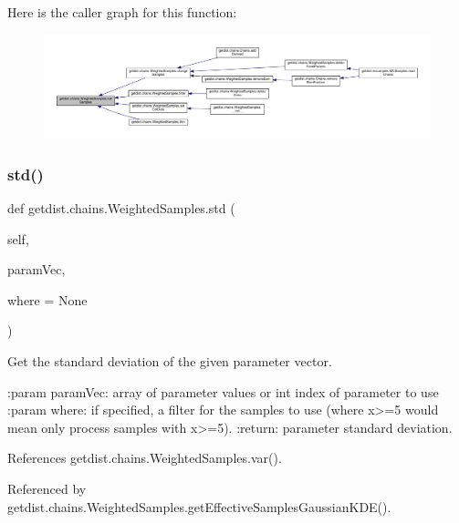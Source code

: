 Here is the caller graph for this function\+:
\nopagebreak
\begin{figure}[H]
\begin{center}
\leavevmode
\includegraphics[width=350pt]{classgetdist_1_1chains_1_1WeightedSamples_a94b1bddfee0767cad6fdca9c12a045d9_icgraph}
\end{center}
\end{figure}
\mbox{\label{classgetdist_1_1chains_1_1WeightedSamples_aeaa6411b75fd033e7ad9761cdcbc28cf}} 
\subsubsection{\texorpdfstring{std()}{std()}}
{\footnotesize\ttfamily def getdist.\+chains.\+Weighted\+Samples.\+std (\begin{DoxyParamCaption}\item[{}]{self,  }\item[{}]{param\+Vec,  }\item[{}]{where = {\ttfamily None} }\end{DoxyParamCaption})}

\begin{DoxyVerb}Get the standard deviation of the given parameter vector.

:param paramVec: array of parameter values or int index of parameter to use
:param where: if specified, a filter for the samples to use (where x>=5 would mean only process samples with x>=5).
:return: parameter standard deviation.
\end{DoxyVerb}
 

References getdist.\+chains.\+Weighted\+Samples.\+var().



Referenced by getdist.\+chains.\+Weighted\+Samples.\+get\+Effective\+Samples\+Gaussian\+K\+D\+E().

